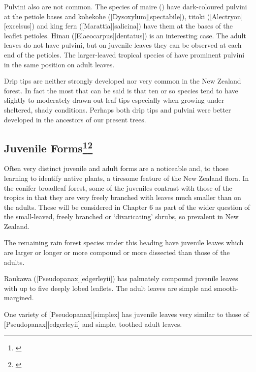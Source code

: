 Pulvini also are not common.
The species of maire () have dark-coloured pulvini at the petiole bases and kohekohe ([Dysoxylum][spectabile]), titoki ([Alectryon][excelsus]) and king fern ([Marattia][salicina]) have them at the bases of the leaflet petioles.
Hinau ([Elaeocarpus][dentatus]) is an interesting case.
The adult leaves do not have pulvini, but on juvenile leaves they can be observed at each end of the petioles.
The larger-leaved tropical species of  have prominent pulvini in the same position on adult leaves.

Drip tips are neither strongly developed nor very common in the New Zealand forest.
In fact the most that can be said is that ten or so species tend to have slightly to moderately drawn out leaf tips especially when growing under sheltered, shady conditions.
Perhaps both drip tips and pulvini were better developed in the ancestors of our present trees.

\subsection[Juvenile Forms]{Juvenile Forms\footnote{\cite{godley1985paths}}\footnote{\cite{philipson1964habit}}}

Often very distinct juvenile and adult forms are a noticeable and, to those learning to identify native plants, a tiresome feature of the New Zealand flora.
In the conifer broadleaf forest, some of the juveniles contrast with those of the tropics in that they are very freely branched with leaves much smaller than on the adults.
These will be considered in Chapter 6 as part of the wider question of the small-leaved, freely branched or `divaricating' shrubs, so prevalent in New Zealand.

The remaining rain forest species under this heading have juvenile leaves which are larger or longer or more compound or more dissected than those of the adults.

Raukawa ([Pseudopanax][edgerleyii]) has palmately compound juvenile leaves with up to five deeply lobed leaflets.
The adult leaves are simple and smooth-margined.

One variety of [Pseudopanax][simplex] has juvenile leaves very similar to those of [Pseudopanax][edgerleyii] and simple, toothed adult leaves.

